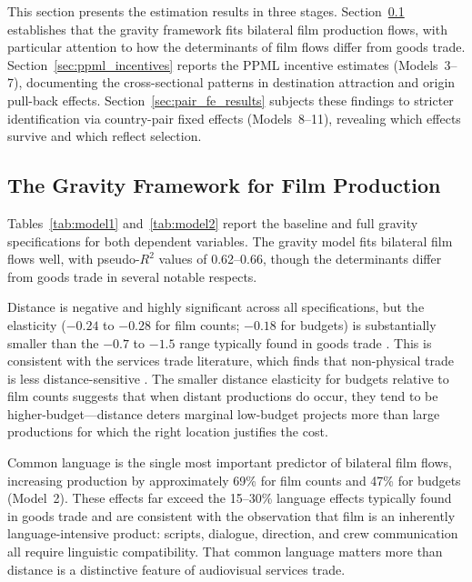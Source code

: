 
This section presents the estimation results in three stages. Section~\ref{sec:gravity_results} establishes that the gravity framework fits bilateral film production flows, with particular attention to how the determinants of film flows differ from goods trade. Section~\ref{sec:ppml_incentives} reports the PPML incentive estimates (Models~3--7), documenting the cross-sectional patterns in destination attraction and origin pull-back effects. Section~\ref{sec:pair_fe_results} subjects these findings to stricter identification via country-pair fixed effects (Models~8--11), revealing which effects survive and which reflect selection.

\subsection{The Gravity Framework for Film Production}
\label{sec:gravity_results}

Tables~\ref{tab:model1} and~\ref{tab:model2} report the baseline and full gravity specifications for both dependent variables. The gravity model fits bilateral film flows well, with pseudo-$R^2$ values of 0.62--0.66, though the determinants differ from goods trade in several notable respects.

Distance is negative and highly significant across all specifications, but the elasticity ($-0.24$ to $-0.28$ for film counts; $-0.18$ for budgets) is substantially smaller than the $-0.7$ to $-1.5$ range typically found in goods trade \citep{head2014}. This is consistent with the services trade literature, which finds that non-physical trade is less distance-sensitive \citep{walsh2006, kimura2006}. The smaller distance elasticity for budgets relative to film counts suggests that when distant productions do occur, they tend to be higher-budget---distance deters marginal low-budget projects more than large productions for which the right location justifies the cost.

Common language is the single most important predictor of bilateral film flows, increasing production by approximately 69\% for film counts and 47\% for budgets (Model~2). These effects far exceed the 15--30\% language effects typically found in goods trade and are consistent with the observation that film is an inherently language-intensive product: scripts, dialogue, direction, and crew communication all require linguistic compatibility. That common language matters more than distance is a distinctive feature of audiovisual services trade.

